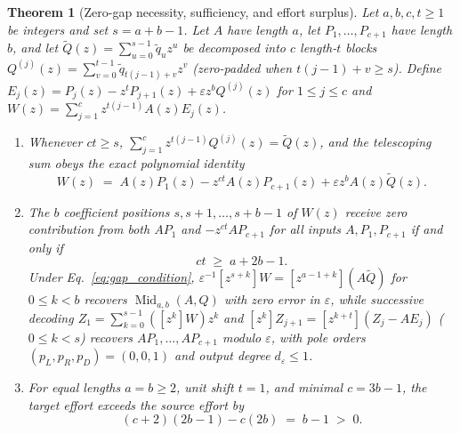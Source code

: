 \documentclass[11pt,a4paper]{article}
\theoremstyle{plain}
\newtheorem{theorem}{Theorem}[section]
\theoremstyle{definition}
\theoremstyle{remark}
\DeclareMathOperator{\Mid}{Mid}
\begin{document}
\begin{theorem}[Zero-gap necessity, sufficiency, and effort surplus]
\label{thm:primal_gap}
Let $a, b, c, t \ge 1$ be integers and set $s = a + b - 1$. Let $A$ have length $a$, let $P_1, \dots, P_{c+1}$ have length $b$, and let $\widetilde{Q}(z) = \sum_{u=0}^{s-1} \tilde{q}_u z^u$ be decomposed into $c$ length-$t$ blocks $Q^{(j)}(z) = \sum_{v=0}^{t-1} \tilde{q}_{t(j-1)+v} z^v$ (zero-padded when $t(j-1) + v \ge s$). Define $E_j(z) = P_j(z) - z^t P_{j+1}(z) + \varepsilon z^b Q^{(j)}(z)$ for $1 \le j \le c$ and $W(z) = \sum_{j=1}^c z^{t(j-1)} A(z) E_j(z)$.
\begin{enumerate}[label=(\roman*)]
\item Whenever $ct \ge s$, $\sum_{j=1}^c z^{t(j-1)} Q^{(j)}(z) = \widetilde{Q}(z)$, and the telescoping sum obeys the exact polynomial identity
\begin{equation}
    W(z) \;=\; A(z) P_1(z) - z^{ct} A(z) P_{c+1}(z) + \varepsilon z^b A(z) \widetilde{Q}(z) .
    \label{eq:primal_identity}
\end{equation}
\item The $b$ coefficient positions $s, s + 1, \dots, s + b - 1$ of $W(z)$ receive zero contribution from both $A P_1$ and $-z^{ct} A P_{c+1}$ for all inputs $A, P_1, P_{c+1}$ if and only if
\begin{equation}
    ct \;\ge\; a + 2b - 1 .
    \label{eq:gap_condition}
\end{equation}
Under Eq.~\eqref{eq:gap_condition}, $\varepsilon^{-1} [z^{s+k}]W = [z^{a-1+k}](A\widetilde{Q})$ for $0 \le k < b$ recovers $\Mid_{a,b}(A, Q)$ with zero error in $\varepsilon$, while successive decoding $Z_1 = \sum_{k=0}^{s-1} ([z^k]W) z^k$ and $[z^k]Z_{j+1} = [z^{k+t}](Z_j - A E_j)$ ($0 \le k < s$) recovers $A P_1, \dots, A P_{c+1}$ modulo $\varepsilon$, with pole orders $(p_L, p_R, p_D) = (0, 0, 1)$ and output degree $d_\varepsilon \le 1$.
\item For equal lengths $a = b \ge 2$, unit shift $t = 1$, and minimal $c = 3b - 1$, the target effort exceeds the source effort by
\begin{equation}
    (c + 2)(2b - 1) - c(2b) \;=\; b - 1 \;>\; 0 .
    \label{eq:effort_surplus}
\end{equation}
\end{enumerate}
\end{theorem}
\end{document}
